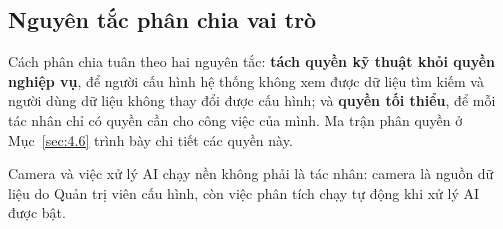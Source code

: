 \subsection{Nguyên tắc phân chia vai trò}
\label{sec:4.1.4}

Cách phân chia tuân theo hai nguyên tắc: \textbf{tách quyền kỹ thuật khỏi quyền nghiệp vụ}, để người cấu hình hệ thống không xem được dữ liệu tìm kiếm và người dùng dữ liệu không thay đổi được cấu hình; và \textbf{quyền tối thiểu}, để mỗi tác nhân chỉ có quyền cần cho công việc của mình. Ma trận phân quyền ở Mục~\ref{sec:4.6} trình bày chi tiết các quyền này.

Camera và việc xử lý AI chạy nền không phải là tác nhân: camera là nguồn dữ liệu do Quản trị viên cấu hình, còn việc phân tích chạy tự động khi xử lý AI được bật.

